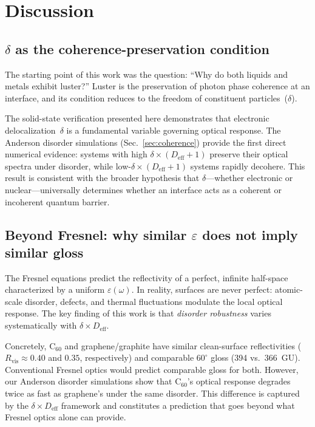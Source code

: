 \documentclass[twocolumn,showpacs,preprintnumbers,amsmath,amssymb,prb]{revtex4-2}
\begin{document}
\section{Discussion}
\label{sec:discussion}

\subsection{$\delta$ as the coherence-preservation condition}

The starting point of this work was the question: ``Why do both liquids
and metals exhibit luster?'' Luster is the preservation of photon phase
coherence at an interface, and its condition reduces to the freedom of
constituent particles~($\delta$).

The solid-state verification presented here demonstrates that electronic
delocalization~$\delta$ is a fundamental variable governing optical
response. The Anderson disorder simulations
(Sec.~\ref{sec:coherence}) provide the first direct numerical evidence:
systems with high $\delta \times (D_\mathrm{eff}+1)$ preserve their
optical spectra under disorder, while
low-$\delta \times (D_\mathrm{eff}+1)$ systems rapidly decohere. This result is consistent with the broader
hypothesis that $\delta$---whether electronic or nuclear---universally
determines whether an interface acts as a coherent or incoherent quantum
barrier.

\subsection{Beyond Fresnel: why similar $\varepsilon$ does not imply
  similar gloss}

The Fresnel equations predict the reflectivity of a perfect, infinite
half-space characterized by a uniform $\varepsilon(\omega)$. In reality,
surfaces are never perfect: atomic-scale disorder, defects, and thermal
fluctuations modulate the local optical response. The key finding of
this work is that \emph{disorder robustness} varies systematically with
$\delta \times D_\mathrm{eff}$.

Concretely, C$_{60}$ and graphene/graphite have similar clean-surface
reflectivities ($R_\mathrm{vis} \approx 0.40$ and $0.35$,
respectively) and comparable $60^\circ$ gloss (394 vs.\ 366~GU).
Conventional Fresnel optics would predict comparable gloss for both.
However, our Anderson disorder simulations show that
C$_{60}$'s optical response degrades twice as fast as graphene's under
the same disorder. This difference is captured by the
$\delta \times D_\mathrm{eff}$ framework and constitutes a prediction
that goes beyond what Fresnel optics alone can provide.
\end{document}
